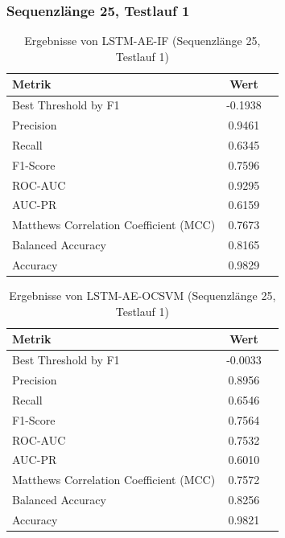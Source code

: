 \documentclass[a4paper,12pt]{article}
\begin{document}
\subsubsection{Sequenzlänge 25, Testlauf 1}
\begin{table}[H]
	\centering
	\caption{Ergebnisse von LSTM-AE-IF (Sequenzlänge 25, Testlauf 1)}
	\begin{tabular}{lcc}
		\hline
		Metrik & Wert \\
		\hline
		Best Threshold by F1 & -0.1938 \\
		Precision & 0.9461 \\
		Recall & 0.6345 \\
		F1-Score & 0.7596 \\
		ROC-AUC & 0.9295 \\
		AUC-PR & 0.6159 \\
		Matthews Correlation Coefficient (MCC) & 0.7673 \\
		Balanced Accuracy & 0.8165 \\
		Accuracy & 0.9829 \\
		\hline
	\end{tabular}
\end{table}

\begin{table}[H]
	\centering
	\caption{Ergebnisse von LSTM-AE-OCSVM (Sequenzlänge 25, Testlauf 1)}
	\begin{tabular}{lcc}
		\hline
		Metrik & Wert \\
		\hline
		Best Threshold by F1 & -0.0033 \\
		Precision & 0.8956 \\
		Recall & 0.6546 \\
		F1-Score & 0.7564 \\
		ROC-AUC & 0.7532 \\
		AUC-PR & 0.6010 \\
		Matthews Correlation Coefficient (MCC) & 0.7572 \\
		Balanced Accuracy & 0.8256 \\
		Accuracy & 0.9821 \\
		\hline
	\end{tabular}
\end{table}
\end{document}
